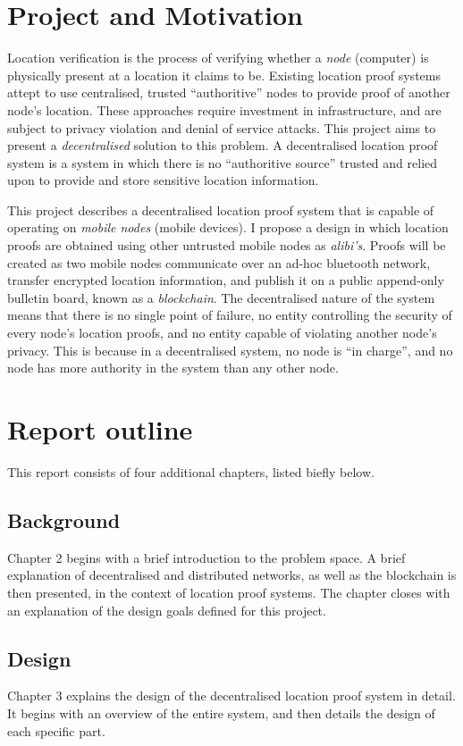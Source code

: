 \section{Project and Motivation}
Location verification is the process of verifying whether a \textit{node} (computer) is physically present at a location it claims to be. Existing location proof systems attept to use centralised, trusted ``authoritive'' nodes to provide proof of another node's location. These approaches require investment in infrastructure, and are subject to privacy violation and denial of service attacks. This project aims to present a \textit{decentralised} solution to this problem. A decentralised location proof system is a system in which there is no ``authoritive source'' trusted and relied upon to provide and store sensitive location information.

This project describes a decentralised location proof system that is capable of operating on \textit{mobile nodes} (mobile devices). I propose a design in which location proofs are obtained using other untrusted mobile nodes as \textit{alibi's}. Proofs will be created as two mobile nodes communicate over an ad-hoc bluetooth network, transfer encrypted location information, and publish it on a public append-only bulletin board, known as a \textit{blockchain}. The decentralised nature of the system means that there is no single point of failure, no entity controlling the security of every node's location proofs, and no entity capable of violating another node's privacy. This is because in a decentralised system, no node is ``in charge'', and no node has more authority in the system than any other node.

\section{Report outline}
This report consists of four additional chapters, listed biefly below.

\subsection{Background}
Chapter 2 begins with a brief introduction to the problem space. A brief explanation of decentralised and distributed networks, as well as the blockchain is then presented, in the context of location proof systems. The chapter closes with an explanation of the design goals defined for this project.

\subsection{Design}
Chapter 3 explains the design of the decentralised location proof system in detail. It begins with an overview of the entire system, and then details the design of each specific part.

